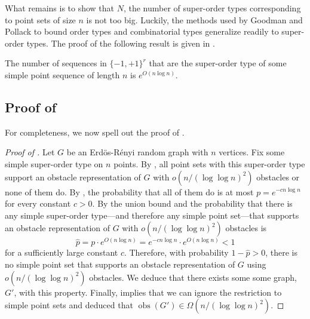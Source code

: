 \documentclass{patmorin}
\DeclareMathOperator{\obs}{obs}
\begin{document}
What remains is to show that $N$, the number of super-order types corresponding
to point sets of size $n$ is not too big.  Luckily, the methods used
by Goodman and Pollack to bound order types and combinatorial types
generalize readily to super-order types.  The proof of the following
result is given in .

\begin{lem}
  The number of sequences in $\{-1,+1\}^{r}$ that are the super-order
  type of some simple point sequence of length $n$ is $e^{O(n\log n)}$.
\end{lem}

\subsection{Proof of }

For completeness, we now spell out the proof of .

\begin{proof}[Proof of ]
  Let $G$ be an Erd\"os-R\'enyi random graph with $n$ vertices.  Fix some
  simple super-order type on $n$ points.  By , all point
  sets with this super-order type support an obstacle representation
  of $G$ with $o(n/(\log\log n)^2)$ obstacles or none of them do.
  By , the probability that all of them do is
  at most $p=e^{-cn\log n}$ for every constant $c>0$.  By the union bound
  and  the probability that there is any
  simple super-order type---and therefore any simple point set---that supports an
  obstacle representation of $G$ with $o(n/(\log\log n)^2)$ obstacles is
  \[
     \hat p = p\cdot e^{O(n\log n)} = e^{-cn\log n}\cdot e^{O(n\log n)} < 1
  \]
  for a sufficiently large constant $c$.  Therefore, with probability
  $1-\hat p > 0$, there is no simple point set that supports an obstacle
  representation of $G$ using $o(n/(\log\log n)^2)$ obstacles. We deduce
  that there exists some some graph, $G'$, with this property.  Finally,
   implies that we can ignore the restriction to simple
  point sets and deduced that $\obs(G')\in \Omega(n/(\log\log n)^2)$.
\end{proof}
\end{document}

